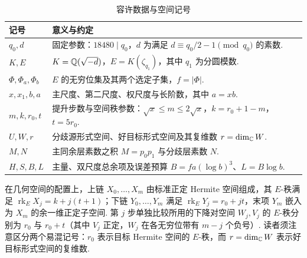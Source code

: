 \begin{table}[htbp]
\centering
\caption{容许数据与空间记号}
\label{tab:global-scales}
\small
\begin{tabular}{@{}>{\raggedright\arraybackslash}p{}
                  >{\raggedright\arraybackslash}p{}@{}}
\toprule
记号 & 意义与约定\\
\midrule
$q_0,d$ & 固定参数：$18480\mid q_0$，$d$ 为满足 $d\equiv q_0/2-1\pmod{q_0}$ 的素数. \\
$K,E$ & $K=\mathbb{Q}(\sqrt{-d})$，$E=K(\zeta_{q_1})$，其中 $q_1$ 为分圆模数. \\
$\Phi,\Phi_a,\Phi_b$ & $E$ 的无穷位集及其两个选定子集，$f=|\Phi|$. \\
$x,x_1,b,a$ & 主尺度、第二尺度、权尺度与长阶数，其中 $a=xb$. \\
$m,k,r_0,t$ & 提升步数与空间秩参数：$\sqrt{x}\le m\le2\sqrt{x}$，$k=r_0+1-m$，$t=5r_0$. \\
$U,W,r$ & 分歧源形式空间、好目标形式空间及其复维数 $r=\dim_{\mathbb{C}}W$. \\
$M,N$ & 主同余层素数之积 $M=p_0p_1$ 与分歧层素数 $N$. \\
$H,S,B,L$ & 主量、双尺度总余项及误差预算 $B=fa(\log b)^3$、$L=B\log b$. \\
\bottomrule
\end{tabular}
\end{table}

在几何空间的配置上，上链 $X_0,\ldots,X_m$ 由标准正定 Hermite 空间组成，其 $E$-秩满足 $\operatorname{rk}_E X_j=k+j(t+1)$；下链 $Y_0,\ldots,Y_m$ 满足 $\operatorname{rk}_E Y_j=r_0+jt$，末项 $Y_m$ 嵌入为 $X_m$ 的余一维正定子空间. 第 $j$ 步单独比较所用的下降对空间 $W_j,V_j$ 的 $E$-秩分别为 $r_0$ 与 $r_0+t$（其中 $V_j$ 正定，$W_j$ 在各无穷位带有 $m-j$ 个负号）. 读者须注意区分两个易混记号：$r_0$ 表示目标 Hermite 空间的 $E$-秩，而 $r=\dim_{\mathbb{C}}W$ 表示好目标形式空间的复维数.
